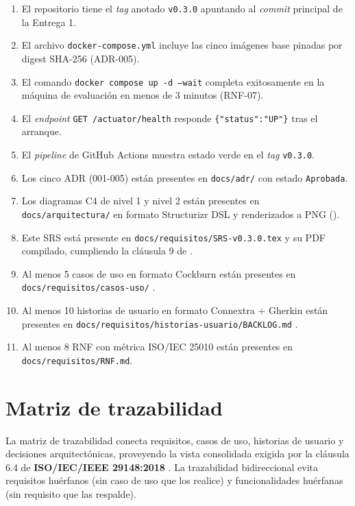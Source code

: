 \documentclass[11pt,a4paper,twoside]{report}
\begin{document}
\begin{enumerate}[leftmargin=1.5em,itemsep=3pt]
    \item El repositorio tiene el \emph{tag} anotado \texttt{v0.3.0} apuntando al \emph{commit} principal de la Entrega 1.
    \item El archivo \texttt{docker-compose.yml} incluye las cinco im\'agenes base pinadas por digest SHA-256 (ADR-005).
    \item El comando \texttt{docker compose up -d --wait} completa exitosamente en la m\'aquina de evaluaci\'on en menos de 3 minutos (RNF-07).
    \item El \emph{endpoint} \texttt{GET /actuator/health} responde \texttt{\{"status":"UP"\}} tras el arranque.
    \item El \emph{pipeline} de GitHub Actions muestra estado verde en el \emph{tag} \texttt{v0.3.0}.
    \item Los cinco ADR (001-005) est\'an presentes en \texttt{docs/adr/} con estado \texttt{Aprobada}.
    \item Los diagramas C4 de nivel 1 y nivel 2 est\'an presentes en \texttt{docs/arquitectura/} en formato Structurizr DSL y renderizados a PNG (\cite{brown2023c4}).
    \item Este SRS est\'a presente en \texttt{docs/requisitos/SRS-v0.3.0.tex} y su PDF compilado, cumpliendo la cl\'ausula 9 de \cite{iso29148}.
    \item Al menos 5 casos de uso en formato Cockburn est\'an presentes en \texttt{docs/requisitos/casos-uso/} \cite{cockburn2001writing}.
    \item Al menos 10 historias de usuario en formato Connextra + Gherkin est\'an presentes en \texttt{docs/requisitos/historias-usuario/BACKLOG.md} \cite{cohn2004user}.
    \item Al menos 8 RNF con m\'etrica ISO/IEC 25010 \cite{iso25010} est\'an presentes en \texttt{docs/requisitos/RNF.md}.
\end{enumerate}

\chapter{Matriz de trazabilidad}
\label{cap:trazabilidad}

\begin{cajaNota}[title=Prop\'osito de este cap\'itulo]
    La matriz de trazabilidad conecta requisitos, casos de uso, historias de usuario y decisiones arquitect\'onicas, proveyendo la vista consolidada exigida por la cl\'ausula 6.4 de \textbf{ISO/IEC/IEEE 29148:2018} \cite{iso29148}. La trazabilidad bidireccional evita requisitos hu\'erfanos (sin caso de uso que los realice) y funcionalidades hu\'erfanas (sin requisito que las respalde).
\end{cajaNota}
\end{document}
